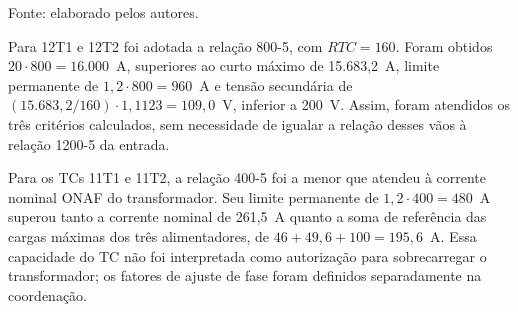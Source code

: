 \begin{table}[htbp]
    \centering
    \caption{Resultados dos critérios de dimensionamento dos TCs.}
    \label{tab:resultados_tc}
    \par\vspace{2pt}
    {\small Fonte: elaborado pelos autores.}
\end{table}

Para 12T1 e 12T2 foi adotada a relação 800-5, com $RTC=160$. Foram obtidos $20\cdot800=16.000$~A, superiores ao curto máximo de 15.683,2~A, limite permanente de $1{,}2\cdot800=960$~A e tensão secundária de $(15.683{,}2/160)\cdot1{,}1123=109{,}0$~V, inferior a 200~V. Assim, foram atendidos os três critérios calculados, sem necessidade de igualar a relação desses vãos à relação 1200-5 da entrada.

Para os TCs 11T1 e 11T2, a relação 400-5 foi a menor que atendeu à corrente nominal ONAF do transformador. Seu limite permanente de $1{,}2\cdot400=480$~A superou tanto a corrente nominal de 261,5~A quanto a soma de referência das cargas máximas dos três alimentadores, de $46+49{,}6+100=195{,}6$~A. Essa capacidade do TC não foi interpretada como autorização para sobrecarregar o transformador; os fatores de ajuste de fase foram definidos separadamente na coordenação.

